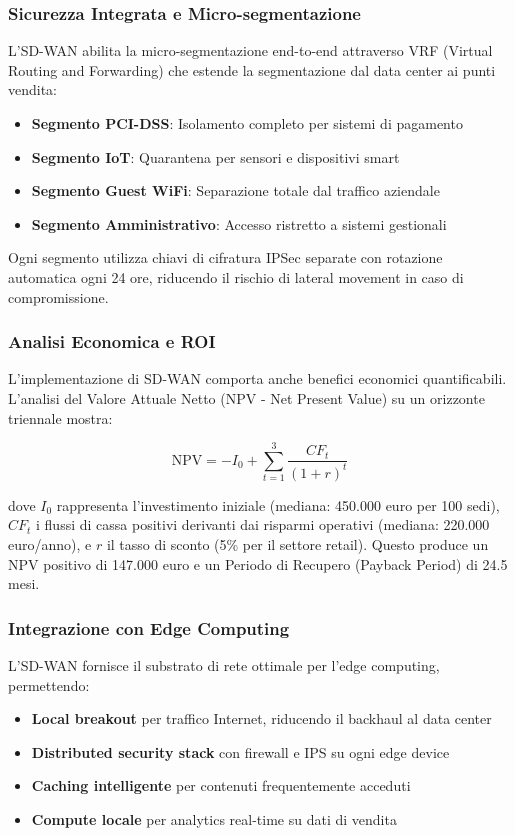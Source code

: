 \subsubsection{Sicurezza Integrata e Micro-segmentazione}

L'SD-WAN abilita la micro-segmentazione end-to-end attraverso VRF (Virtual Routing and Forwarding) che estende la segmentazione dal data center ai punti vendita:

\begin{itemize}
    \item \textbf{Segmento PCI-DSS}: Isolamento completo per sistemi di pagamento
    \item \textbf{Segmento IoT}: Quarantena per sensori e dispositivi smart
    \item \textbf{Segmento Guest WiFi}: Separazione totale dal traffico aziendale
    \item \textbf{Segmento Amministrativo}: Accesso ristretto a sistemi gestionali
\end{itemize}

Ogni segmento utilizza chiavi di cifratura IPSec separate con rotazione automatica ogni 24 ore, riducendo il rischio di lateral movement in caso di compromissione.

\subsubsection{Analisi Economica e ROI}

L'implementazione di SD-WAN comporta anche benefici economici quantificabili. L'analisi del Valore Attuale Netto (NPV - Net Present Value) su un orizzonte triennale mostra:

\begin{equation}
\text{NPV} = -I_0 + \sum_{t=1}^{3} \frac{CF_t}{(1+r)^t}
\end{equation}

dove $I_0$ rappresenta l'investimento iniziale (mediana: 450.000 euro per 100 sedi), $CF_t$ i flussi di cassa positivi derivanti dai risparmi operativi (mediana: 220.000 euro/anno), e $r$ il tasso di sconto (5\% per il settore retail). Questo produce un NPV positivo di 147.000 euro e un Periodo di Recupero (Payback Period) di 24.5 mesi.

\subsubsection{Integrazione con Edge Computing}

L'SD-WAN fornisce il substrato di rete ottimale per l'edge computing, permettendo:
\begin{itemize}
    \item \textbf{Local breakout} per traffico Internet, riducendo il backhaul al data center
    \item \textbf{Distributed security stack} con firewall e IPS su ogni edge device
    \item \textbf{Caching intelligente} per contenuti frequentemente acceduti
    \item \textbf{Compute locale} per analytics real-time su dati di vendita
\end{itemize}

